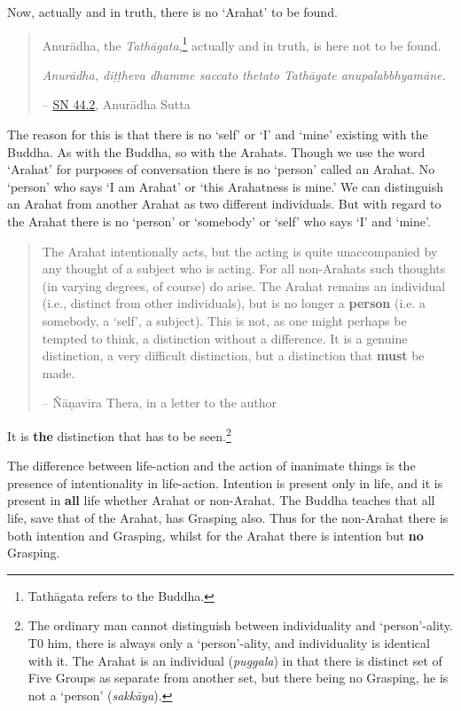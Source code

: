 Now, actually and in truth, there is no `Arahat' to be found.

\begin{quote}
Anurādha, the \emph{Tathāgata},\footnote{Tathāgata refers to the Buddha.} actually and in truth, is here not to be found.

\emph{Anurādha, diṭṭheva dhamme saccato thetato Tathāgate anupalabbhyamāne.}

 -- \href{https://suttacentral.net/sn44.2/en/sujato}{SN 44.2}, Anurādha Sutta
\end{quote}

The reason for this is that there is no `self' or `I' and `mine' existing with the Buddha. As with the Buddha, so with the Arahats. Though we use the word `Arahat' for purposes of conversation there is no `person' called an Arahat. No `person' who says `I am Arahat' or `this Arahatness is mine.' We can distinguish an Arahat from another Arahat as two different individuals. But with regard to the Arahat there is no `person' or `somebody' or `self' who says `I' and `mine'.

\begin{quote}
The Arahat intentionally acts, but the acting is quite unaccompanied by any thought of a subject who is acting. For all non-Arahats such thoughts (in varying degrees, of course) do arise. The Arahat remains an individual (i.e., distinct from other individuals), but is no longer a \textbf{person} (i.e. a somebody, a `self', a subject). This is not, as one might perhaps be tempted to think, a distinction without a difference. It is a genuine distinction, a very difficult distinction, but a distinction that \textbf{must} be made.

 -- Ñāṇavīra Thera, in a letter to the author
\end{quote}

It is \textbf{the} distinction that has to be seen.\footnote{The ordinary man cannot distinguish between individuality and `person'-ality. T0 him, there is always only a `person'-ality, and individuality is identical with it. The Arahat is an individual (\emph{puggala}) in that there is distinct set of Five Groups as separate from another set, but there being no Grasping, he is not a `person' (\emph{sakkāya}).}

The difference between life-action and the action of inanimate things is the presence of intentionality in life-action. Intention is present only in life, and it is present in \textbf{all} life whether Arahat or non-Arahat. The Buddha teaches that all life, save that of the Arahat, has Grasping also. Thus for the non-Arahat there is both intention and Grasping, whilst for the Arahat there is intention but \textbf{no} Grasping.

